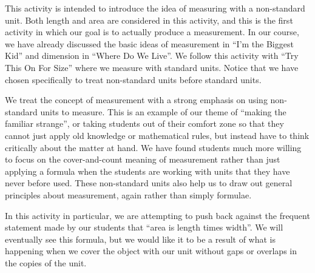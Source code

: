 \documentclass[nooutcomes]{ximera}
\begin{document}
\newpage

\begin{instructorNotes}
This activity is intended to introduce the idea of measuring with a non-standard unit.  Both length and area are considered in this activity, and this is the first activity in which our goal is to actually produce a measurement.  In our course, we have already discussed the basic ideas of measurement in ``I'm the Biggest Kid'' and dimension in ``Where Do We Live''.  We follow this activity with ``Try This On For Size'' where we measure with standard units.  Notice that we have chosen specifically to treat non-standard units before standard units.

We treat the concept of measurement with a strong emphasis on using non-standard units to measure.  This is an example of our theme of ``making the familiar strange'', or taking students out of their comfort zone so that they cannot just apply old knowledge or mathematical rules, but instead have to think critically about the matter at hand.  We have found students much more willing to focus on the cover-and-count meaning of measurement rather than just applying a formula when the students are working with units that they have never before used.  These non-standard units also help us to draw out general principles about measurement, again rather than simply formulae.

In this activity in particular, we are attempting to push back against the frequent statement made by our students that ``area is length times width''.  We will eventually see this formula, but we would like it to be a result of what is happening when we cover the object with our unit without gaps or overlaps in the copies of the unit.



\end{instructorNotes}
\end{document}
